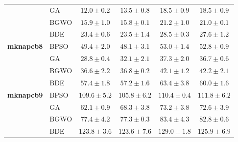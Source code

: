 \begin{table}[htbp]
\begin{tabular*}{\textwidth}{@{\extracolsep{\fill}}llcccc@{}}
                       & GA    &  $\mathbf{12.0 \pm 0.2}$ &           $13.5 \pm 0.8$ &           $18.5 \pm 0.9$ &           $18.5 \pm 0.9$ \\
                       & BGWO  &           $15.9 \pm 1.0$ &  $\mathbf{15.8 \pm 0.1}$ &           $21.2 \pm 1.0$ &           $21.0 \pm 0.1$ \\
                       & BDE   &  $\mathbf{23.4 \pm 0.6}$ &           $23.5 \pm 1.4$ &           $28.5 \pm 0.3$ &           $27.6 \pm 1.2$ \\
    \midrule
    \textbf{mknapcb8}  & BPSO  &           $49.4 \pm 2.0$ &  $\mathbf{48.1 \pm 3.1}$ &           $53.0 \pm 1.4$ &           $52.8 \pm 0.9$ \\
                       & GA    &  $\mathbf{28.8 \pm 0.4}$ &           $32.1 \pm 2.1$ &           $37.3 \pm 2.0$ &           $36.7 \pm 0.6$ \\
                       & BGWO  &  $\mathbf{36.6 \pm 2.2}$ &           $36.8 \pm 0.2$ &           $42.1 \pm 1.2$ &           $42.2 \pm 2.1$ \\
                       & BDE   &           $57.4 \pm 1.8$ &  $\mathbf{57.2 \pm 1.6}$ &           $63.4 \pm 3.8$ &           $60.0 \pm 1.6$ \\
    \midrule
    \textbf{mknapcb9}  & BPSO  &          $109.6 \pm 5.2$ & $\mathbf{105.8 \pm 6.2}$ &          $110.4 \pm 0.4$ &          $111.8 \pm 6.2$ \\
                       & GA    &  $\mathbf{62.1 \pm 0.9}$ &           $68.3 \pm 3.8$ &           $73.2 \pm 3.8$ &           $72.6 \pm 3.9$ \\
                       & BGWO  &           $77.4 \pm 4.2$ &  $\mathbf{77.3 \pm 0.3}$ &           $83.4 \pm 4.3$ &           $82.8 \pm 0.6$ \\
                       & BDE   &          $123.8 \pm 3.6$ & $\mathbf{123.6 \pm 7.6}$ &          $129.0 \pm 1.8$ &          $125.9 \pm 6.9$ \\
    \bottomrule
  \end{tabular*}
\end{table}
